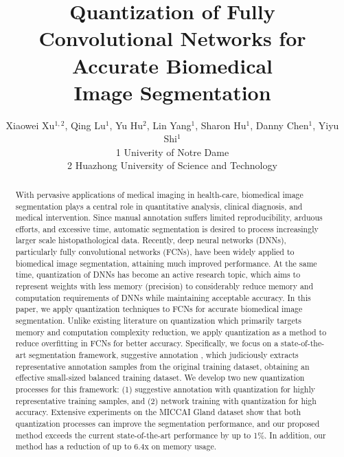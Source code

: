 \documentclass[10pt,twocolumn,letterpaper]{article}
\begin{document}
\title{Quantization of Fully Convolutional Networks for Accurate Biomedical\\ Image Segmentation }

\author{
Xiaowei Xu$^{1,2}$, Qing Lu$^1$, Yu Hu$^2$, Lin Yang$^1$, Sharon Hu$^1$, Danny Chen$^1$, Yiyu Shi$^1$\\
1 Univerity of Notre Dame\\
2 Huazhong University of Science and Technology\\
}

\maketitle

\begin{abstract}

With pervasive applications of medical imaging in health-care, biomedical image segmentation plays a central role in quantitative analysis, clinical diagnosis, and medical intervention.
Since manual annotation suffers limited reproducibility, arduous efforts, and excessive time, automatic segmentation is desired to process increasingly larger scale histopathological data.
Recently, deep neural networks (DNNs), particularly fully convolutional networks (FCNs), have been widely applied to biomedical image segmentation, attaining much improved performance.
At the same time, quantization of DNNs has become an active research topic, which aims to represent weights with less memory (precision) to considerably reduce memory and computation requirements of DNNs while maintaining acceptable accuracy.
In this paper, we apply quantization techniques to FCNs for accurate biomedical image segmentation.
Unlike existing literature on quantization which primarily targets memory and computation complexity reduction, we apply quantization as a method to reduce overfitting in FCNs for better accuracy.
Specifically, we focus on a state-of-the-art segmentation framework, suggestive annotation \cite{yang2017suggestive}, which judiciously extracts representative annotation samples from the original training dataset, obtaining an effective small-sized balanced training dataset.
We develop two new quantization processes for this framework: (1) suggestive annotation with quantization for highly representative training samples, and (2) network training with quantization for high accuracy.
Extensive experiments on the MICCAI Gland dataset show that both quantization processes can improve the segmentation performance, and our proposed method exceeds the current state-of-the-art performance by up to 1\%.
In addition, our method has a reduction of up to 6.4x on memory usage.
\end{abstract}
\end{document}
